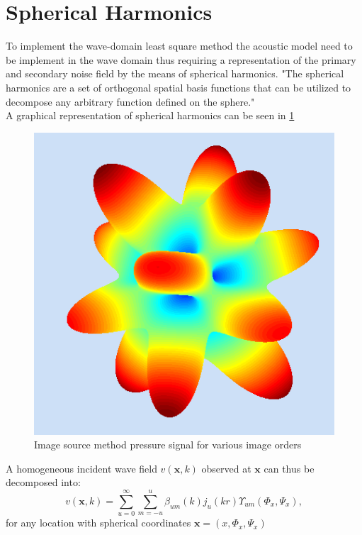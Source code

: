 \section{Spherical Harmonics}
To implement the wave-domain least square method the acoustic model need to be implement in the wave domain thus requiring a representation of the primary and secondary noise field by the means of spherical harmonics.
"The spherical harmonics are a set of orthogonal spatial basis functions that can be utilized
to decompose any arbitrary function defined on the sphere."\cite{Samarasinghe2018}\\ A graphical representation of spherical harmonics can be seen in \ref{fig:sph_harmonics}
\begin{figure}
    \centerline{\includegraphics[width=1.3\textwidth,keepaspectratio]{LaTeX/images/plots/spherical_hamonics.png}}
    \caption{Image source method pressure signal for various image orders}
    \label{fig:sph_harmonics}
\end{figure}
A homogeneous incident wave field $v(\mathbf{x},k)$ observed at $\mathbf{x}$ can thus be decomposed into\cite{Zhang2019}:
\begin{equation}
    v(\mathbf{x},k)=\sum_{u=0}^\infty \sum_{m=-u}^u\beta_{um}(k)j_u(kr)\Upsilon_{um}(\Phi_x,\Psi_x),
\end{equation}
for any location with spherical coordinates $\mathbf{x}=(x,\Phi_x,\Psi_x)$\\
